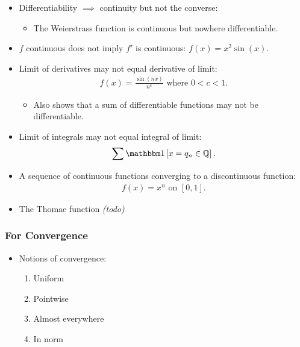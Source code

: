 \begin{itemize}
\item
  Differentiability \(\implies\) continuity but not the converse:

  \begin{itemize}
  \tightlist
  \item
    The Weierstrass function is continuous but nowhere differentiable.
  \end{itemize}
\item
  \(f\) continuous does not imply \(f'\) is continuous:
  \(f(x) = x^2 \sin(x)\).
\item
  Limit of derivatives may not equal derivative of limit:
  \begin{align*}
  f(x) = \frac{\sin(nx)}{n^c} \text{ where } 0 < c < 1.
  \end{align*}

  \begin{itemize}
  \tightlist
  \item
    Also shows that a sum of differentiable functions may not be
    differentiable.
  \end{itemize}
\item
  Limit of integrals may not equal integral of limit:
  \begin{align*}
  \sum \indic{x = q_n \in \QQ}
  .\end{align*}
\item
  A sequence of continuous functions converging to a discontinuous
  function:
  \begin{align*}
  f(x) = x^n \text{ on } [0, 1]
  .\end{align*}
\item
  The Thomae function \emph{(todo)}
\end{itemize}

\hypertarget{for-convergence}{%
\subsubsection{For Convergence}\label{for-convergence}}

\begin{itemize}
\tightlist
\item
  Notions of convergence:

  \begin{enumerate}
  \def\labelenumi{\arabic{enumi}.}
  \tightlist
  \item
    Uniform
  \item
    Pointwise
  \item
    Almost everywhere
  \item
    In norm
  \end{enumerate}
\end{itemize}

